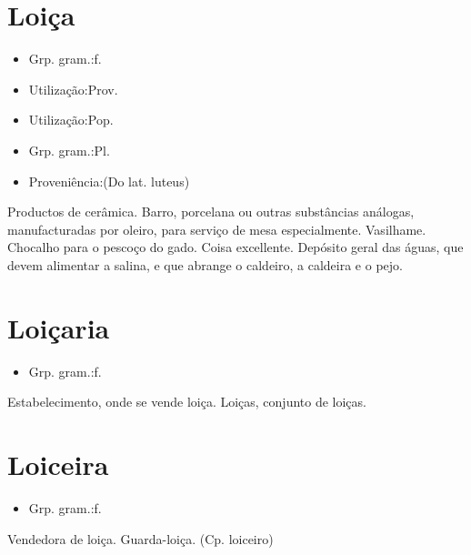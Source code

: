 \section{Loiça}
\begin{itemize}
\item {Grp. gram.:f.}
\end{itemize}
\begin{itemize}
\item {Utilização:Prov.}
\end{itemize}
\begin{itemize}
\item {Utilização:Pop.}
\end{itemize}
\begin{itemize}
\item {Grp. gram.:Pl.}
\end{itemize}
\begin{itemize}
\item {Proveniência:(Do lat. \textunderscore luteus\textunderscore )}
\end{itemize}
Productos de cerâmica.
Barro, porcelana ou outras substâncias análogas, manufacturadas por oleiro, para serviço de mesa especialmente.
Vasilhame.
Chocalho para o pescoço do gado.
Coisa excellente.
Depósito geral das águas, que devem alimentar a salina, e que abrange o caldeiro, a caldeira e o pejo.
\section{Loiçaria}
\begin{itemize}
\item {Grp. gram.:f.}
\end{itemize}
Estabelecimento, onde se vende loiça.
Loiças, conjunto de loiças.
\section{Loiceira}
\begin{itemize}
\item {Grp. gram.:f.}
\end{itemize}
Vendedora de loiça.
Guarda-loiça.
(Cp. \textunderscore loiceiro\textunderscore )
